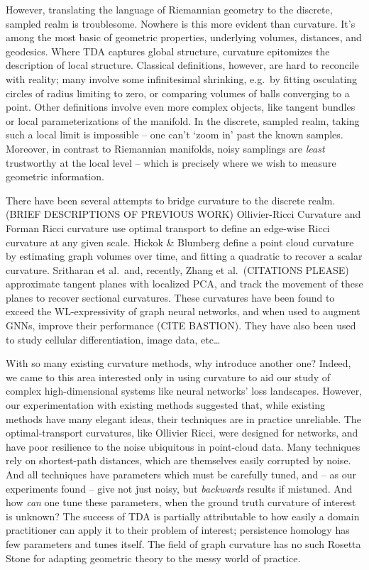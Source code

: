 \documentclass[
  letterpaper,
  DIV=11,
  numbers=noendperiod]{scrartcl}
\theoremstyle{plain}
\theoremstyle{plain}
\theoremstyle{definition}
\theoremstyle{plain}
\theoremstyle{definition}
\theoremstyle{plain}
\theoremstyle{remark}
\begin{document}
However, translating the language of Riemannian geometry to the
discrete, sampled realm is troublesome. Nowhere is this more evident
than curvature. It's among the most basic of geometric properties,
underlying volumes, distances, and geodesics. Where TDA captures global
structure, curvature epitomizes the description of local structure.
Classical definitions, however, are hard to reconcile with reality; many
involve some infinitesimal shrinking, e.g.~by fitting osculating circles
of radius limiting to zero, or comparing volumes of balls converging to
a point. Other definitions involve even more complex objects, like
tangent bundles or local parameterizations of the manifold. In the
discrete, sampled realm, taking such a local limit is impossible -- one
can't `zoom in' past the known samples. Moreover, in contrast to
Riemannian manifolds, noisy samplings are \emph{least} trustworthy at
the local level -- which is precisely where we wish to measure geometric
information.

There have been several attempts to bridge curvature to the discrete
realm. (BRIEF DESCRIPTIONS OF PREVIOUS WORK) Ollivier-Ricci Curvature
and Forman Ricci curvature use optimal transport to define an edge-wise
Ricci curvature at any given scale. Hickok \& Blumberg define a point
cloud curvature by estimating graph volumes over time, and fitting a
quadratic to recover a scalar curvature. Sritharan et al.~and, recently,
Zhang et al.~(CITATIONS PLEASE) approximate tangent planes with
localized PCA, and track the movement of these planes to recover
sectional curvatures. These curvatures have been found to exceed the
WL-expressivity of graph neural networks, and when used to augment GNNs,
improve their performance (CITE BASTION). They have also been used to
study cellular differentiation, image data, etc\ldots{}

With so many existing curvature methods, why introduce another one?
Indeed, we came to this area interested only in using curvature to aid
our study of complex high-dimensional systems like neural networks' loss
landscapes. However, our experimentation with existing methods suggested
that, while existing methods have many elegant ideas, their techniques
are in practice unreliable. The optimal-transport curvatures, like
Ollivier Ricci, were designed for networks, and have poor resilience to
the noise ubiquitous in point-cloud data. Many techniques rely on
shortest-path distances, which are themselves easily corrupted by noise.
And all techniques have parameters which must be carefully tuned, and --
as our experiments found -- give not just noisy, but \emph{backwards}
results if mistuned. And how \emph{can} one tune these parameters, when
the ground truth curvature of interest is unknown? The success of TDA is
partially attributable to how easily a domain practitioner can apply it
to their problem of interest; persistence homology has few parameters
and tunes itself. The field of graph curvature has no such Rosetta Stone
for adapting geometric theory to the messy world of practice.
\end{document}
